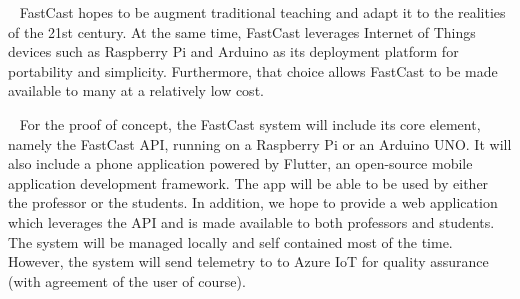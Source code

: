 \documentclass[10pt, a4paper]{article}
\begin{document}
\par ~ FastCast hopes to be augment traditional teaching and adapt it to the realities of the 21st century. At the same time, FastCast leverages Internet of Things devices such as Raspberry Pi and Arduino as its deployment platform for portability and simplicity. Furthermore, that choice allows FastCast to be made available to many at a relatively low cost.

\par ~ For the proof of concept, the FastCast system will include its core element, namely the FastCast API, running on a Raspberry Pi or an Arduino UNO. It will also include a phone application powered by Flutter, an open-source mobile application development framework. The app will be able to be used by either the professor or the students. In addition, we hope to provide a web application which leverages the API and is made available to both professors and students. The system will be managed locally and self contained most of the time. However, the system will send telemetry to to Azure IoT for quality assurance (with agreement of the user of course).
\end{document}
